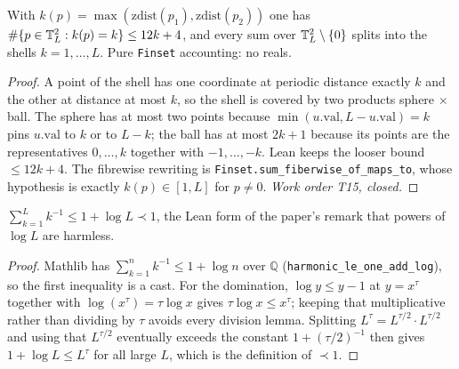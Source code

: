 \begin{lemma}\label{lem:shells}
  \leanok
  With $k(p)=\max(\mathrm{zdist}(p_1),\mathrm{zdist}(p_2))$ one has
  $\#\{p\in\mathbb{T}_L^2: k(p)=k\}\le12k+4$, and every sum over $\mathbb{T}_L^2\setminus\{0\}$
  splits into the shells $k=1,\dots,L$.  Pure \texttt{Finset} accounting: no reals.
\end{lemma}
\begin{proof}\leanok
  A point of the shell has one coordinate at periodic distance exactly $k$ and
  the other at distance at most $k$, so the shell is covered by two products
  sphere $\times$ ball.  The sphere has at most two points because
  $\min(u.\mathrm{val},L-u.\mathrm{val})=k$ pins $u.\mathrm{val}$ to $k$ or to
  $L-k$; the ball has at most $2k+1$ because its points are the representatives
  $0,\dots,k$ together with $-1,\dots,-k$.  Lean keeps the looser bound
  $\le12k+4$.  The fibrewise
  rewriting is \texttt{Finset.sum\_fiberwise\_of\_maps\_to}, whose hypothesis is
  exactly $k(p)\in[1,L]$ for $p\ne0$.
  \emph{Work order T15, closed.}
\end{proof}

\begin{lemma}\label{lem:harmonic}
  \leanok
  $\sum_{k=1}^{L}k^{-1}\le1+\log L\prec1$, the Lean form of the paper's remark
  that powers of $\log L$ are harmless.
\end{lemma}
\begin{proof}\leanok
  Mathlib has $\sum_{k=1}^{n}k^{-1}\le1+\log n$ over $\mathbb Q$
  (\texttt{harmonic\_le\_one\_add\_log}), so the first inequality is a cast.
  For the domination, $\log y\le y-1$ at $y=x^{\tau}$ together with
  $\log(x^{\tau})=\tau\log x$ gives $\tau\log x\le x^{\tau}$; keeping that
  multiplicative rather than dividing by $\tau$ avoids every division lemma.
  Splitting $L^{\tau}=L^{\tau/2}\cdot L^{\tau/2}$ and using that $L^{\tau/2}$
  eventually exceeds the constant $1+(\tau/2)^{-1}$ then gives
  $1+\log L\le L^{\tau}$ for all large $L$, which is the definition of $\prec1$.
\end{proof}

